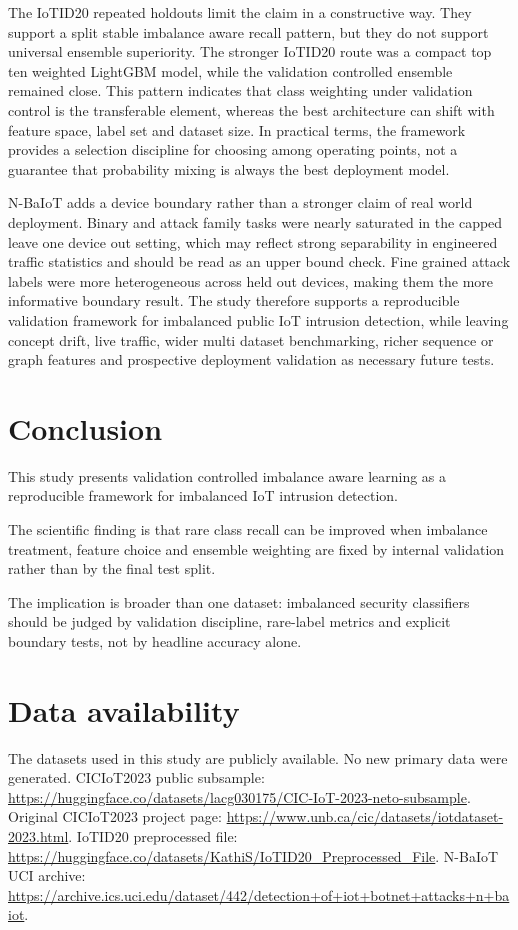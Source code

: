 \documentclass[fleqn,10pt]{wlscirep}
\begin{document}
The IoTID20 repeated holdouts limit the claim in a constructive way. They support a split stable imbalance aware recall pattern, but they do not support universal ensemble superiority. The stronger IoTID20 route was a compact top ten weighted LightGBM model, while the validation controlled ensemble remained close. This pattern indicates that class weighting under validation control is the transferable element, whereas the best architecture can shift with feature space, label set and dataset size. In practical terms, the framework provides a selection discipline for choosing among operating points, not a guarantee that probability mixing is always the best deployment model.

N-BaIoT adds a device boundary rather than a stronger claim of real world deployment. Binary and attack family tasks were nearly saturated in the capped leave one device out setting, which may reflect strong separability in engineered traffic statistics and should be read as an upper bound check. Fine grained attack labels were more heterogeneous across held out devices, making them the more informative boundary result. The study therefore supports a reproducible validation framework for imbalanced public IoT intrusion detection, while leaving concept drift, live traffic, wider multi dataset benchmarking, richer sequence or graph features and prospective deployment validation as necessary future tests.

\section*{Conclusion}

This study presents validation controlled imbalance aware learning as a reproducible framework for imbalanced IoT intrusion detection.

The scientific finding is that rare class recall can be improved when imbalance treatment, feature choice and ensemble weighting are fixed by internal validation rather than by the final test split.

The implication is broader than one dataset: imbalanced security classifiers should be judged by validation discipline, rare-label metrics and explicit boundary tests, not by headline accuracy alone.

\section*{Data availability}

The datasets used in this study are publicly available. No new primary data were generated. CICIoT2023 public subsample: \url{https://huggingface.co/datasets/lacg030175/CIC-IoT-2023-neto-subsample}. Original CICIoT2023 project page: \url{https://www.unb.ca/cic/datasets/iotdataset-2023.html}. IoTID20 preprocessed file: \url{https://huggingface.co/datasets/KathiS/IoTID20_Preprocessed_File}. N-BaIoT UCI archive: \url{https://archive.ics.uci.edu/dataset/442/detection+of+iot+botnet+attacks+n+baiot}.
\end{document}
